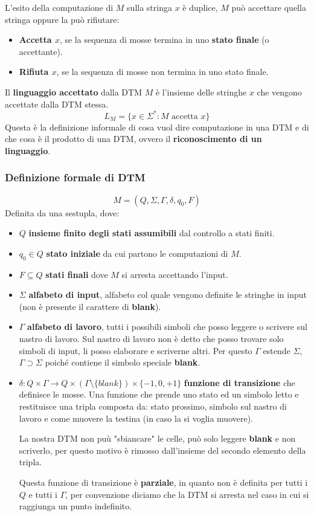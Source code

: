 \documentclass{article}
\begin{document}
L'esito della computazione di $M$ sulla stringa $x$ è duplice, $M$ può accettare quella
stringa oppure la può rifiutare:
\begin{itemize}
    \item \textbf{Accetta $x$}, se la sequenza di mosse termina in uno \textbf{stato finale} (o accettante).
    \item \textbf{Rifiuta $x$}, se la sequenza di mosse non termina in uno stato finale.
\end{itemize}
Il \textbf{linguaggio accettato} dalla DTM $M$ è l'insieme delle stringhe $x$ che
vengono accettate dalla DTM stessa.
$$L_M=\{x\in\Sigma^*:M\text{ accetta }x\}$$
Questa è la definizione informale di cosa vuol dire computazione in una DTM e di che
cosa è il prodotto di una DTM, ovvero il \textbf{riconoscimento di un linguaggio}.

\subsubsection{Definizione formale di DTM}
$$M=(Q,\Sigma,\Gamma,\delta,q_0,F)$$
Definita da una sestupla, dove:
\begin{itemize}
    \item $Q$ \textbf{insieme finito degli stati assumibili} dal controllo a stati finiti.
    \item $q_0\in Q$ \textbf{stato iniziale} da cui partono le computazioni di $M$.
    \item $F\subseteq Q$ \textbf{stati finali} dove $M$ si arresta accettando l'input.
    \item $\Sigma$ \textbf{alfabeto di input}, alfabeto col quale vengono definite le stringhe
    in input (non è presente il carattere di \textbf{blank}).
    \item $\Gamma$ \textbf{alfabeto di lavoro}, tutti i possibili simboli che posso leggere
          o scrivere sul nastro di lavoro. Sul nastro di lavoro non è detto che posso trovare
          solo simboli di input, li posso elaborare e scriverne altri. Per questo $\Gamma$ estende
          $\Sigma$, $\Gamma\supset\Sigma$ poiché contiene il simbolo speciale \textbf{blank}.

    \item $\delta:Q\times\Gamma\rightarrow Q\times(\Gamma\setminus\{blank\})\times\{-1,0,+1\}$
          \textbf{funzione di transizione} che definisce le mosse. Una funzione che prende uno stato ed
          un simbolo letto e restituisce una tripla composta da:
          stato prossimo, simbolo sul nastro di lavoro e come muovere la testina (in caso la si voglia muovere).

          La nostra DTM non
          puù "sbiancare" le celle, può solo leggere \textbf{blank} e non scriverlo, per questo motivo
          è rimosso dall'insieme del secondo elemento della tripla.

          Questa funzione di transizione
          è \textbf{parziale}, in quanto non è definita per tutti i $Q$ e tutti i $\Gamma$,
          per convenzione diciamo che la DTM si arresta nel caso in cui si raggiunga un punto indefinito.
\end{itemize}
\pagebreak
\end{document}
